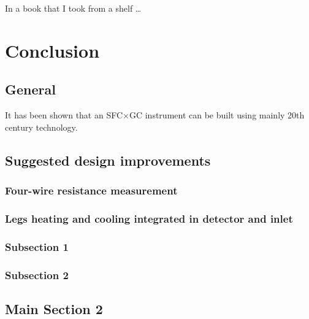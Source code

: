 
\begin{savequote}[45mm]
In a book that I took from a shelf \ldots
{}
\end{savequote}

\chapter{Conclusion} %

\label{Chapter8} %


\section{General}

It has been shown that an SFC×GC instrument can be built using mainly 20th century technology. 


\section{Suggested design improvements}

\subsection{Four-wire resistance measurement}
\subsection{Legs heating and cooling integrated in detector and inlet}
\subsection{}

\subsection{Subsection 1}


\subsection{Subsection 2}


\section{Main Section 2}
